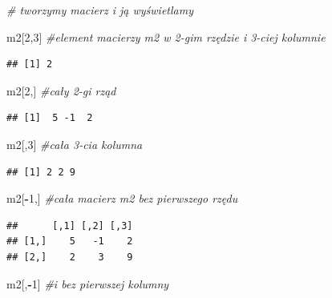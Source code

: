 \documentclass[]{book}
\newenvironment{Shaded}{\begin{snugshade}}{\end{snugshade}}
\newcommand{\DecValTok}[1]{\textcolor[rgb]{0.00,0.00,0.81}{#1}}
\newcommand{\CommentTok}[1]{\textcolor[rgb]{0.56,0.35,0.01}{\textit{#1}}}
\newcommand{\OperatorTok}[1]{\textcolor[rgb]{0.81,0.36,0.00}{\textbf{#1}}}
\newcommand{\NormalTok}[1]{#1}
\theoremstyle{definition}
\theoremstyle{definition}
\theoremstyle{definition}
\theoremstyle{remark}
\begin{document}
\begin{Shaded}
\begin{Highlighting}[]
\CommentTok{# tworzymy macierz i ją wyświetlamy}

\NormalTok{m2[}\DecValTok{2}\NormalTok{,}\DecValTok{3}\NormalTok{] }\CommentTok{#element macierzy m2 w 2-gim rzędzie i 3-ciej kolumnie}
\end{Highlighting}
\end{Shaded}

\begin{verbatim}
## [1] 2
\end{verbatim}

\begin{Shaded}
\begin{Highlighting}[]
\NormalTok{m2[}\DecValTok{2}\NormalTok{,] }\CommentTok{#cały 2-gi rząd}
\end{Highlighting}
\end{Shaded}

\begin{verbatim}
## [1]  5 -1  2
\end{verbatim}

\begin{Shaded}
\begin{Highlighting}[]
\NormalTok{m2[,}\DecValTok{3}\NormalTok{] }\CommentTok{#cała 3-cia kolumna}
\end{Highlighting}
\end{Shaded}

\begin{verbatim}
## [1] 2 2 9
\end{verbatim}

\begin{Shaded}
\begin{Highlighting}[]
\NormalTok{m2[}\OperatorTok{-}\DecValTok{1}\NormalTok{,]  }\CommentTok{#cała macierz m2 bez pierwszego rzędu}
\end{Highlighting}
\end{Shaded}

\begin{verbatim}
##      [,1] [,2] [,3]
## [1,]    5   -1    2
## [2,]    2    3    9
\end{verbatim}

\begin{Shaded}
\begin{Highlighting}[]
\NormalTok{m2[,}\OperatorTok{-}\DecValTok{1}\NormalTok{] }\CommentTok{#i bez pierwszej kolumny}
\end{Highlighting}
\end{Shaded}
\end{document}

